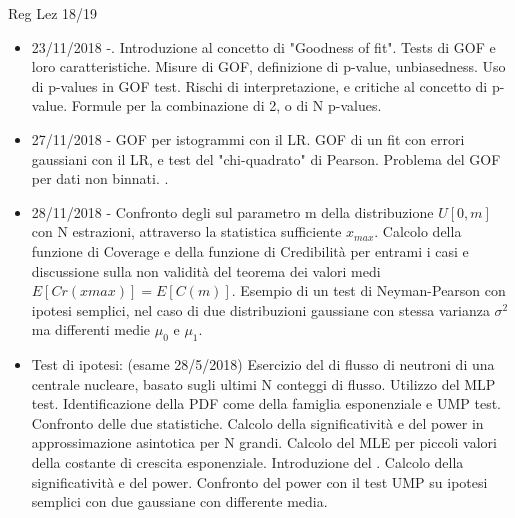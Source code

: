 \begin{frame}[allowframebreaks]{Reg Lez 18/19}
\begin{itemize}
    \item 23/11/2018 -. Introduzione al concetto di "Goodness of fit". Tests di GOF e loro caratteristiche. Misure di GOF, definizione di p-value, unbiasedness. Uso di p-values in GOF test. Rischi di interpretazione, e critiche al concetto di p-value. Formule per la combinazione di 2, o di N p-values.
    
    \item 27/11/2018 - GOF per istogrammi con il LR. GOF di un fit con errori gaussiani con il LR, e test del "chi-quadrato" di Pearson. Problema del GOF per dati non binnati. .
    
    \item 28/11/2018 - Confronto degli  sul parametro m della distribuzione $U[0,m]$ con N estrazioni, attraverso la statistica sufficiente $x_{max}$. Calcolo della funzione di Coverage e della funzione di Credibilità per entrami i casi e discussione sulla non validità del teorema dei valori medi $E[Cr(xmax)] = E[C(m)]$. Esempio di un test di Neyman-Pearson con ipotesi semplici, nel caso di due distribuzioni gaussiane con stessa varianza $\sigma^2$ ma differenti medie $\mu_0$ e $\mu_1$.
    
    \item  Test di ipotesi: (esame 28/5/2018) Esercizio del  di flusso di neutroni di una centrale nucleare, basato sugli ultimi N conteggi di flusso. Utilizzo del MLP test. Identificazione della PDF come della famiglia esponenziale e UMP test. Confronto delle due statistiche. Calcolo della significatività e del power in approssimazione asintotica per N grandi. Calcolo del MLE per piccoli valori della costante di crescita esponenziale. Introduzione del . Calcolo della significatività e del power. Confronto del power con il test UMP su ipotesi semplici con due gaussiane con differente media.
    
    \end{itemize}

\end{frame}

